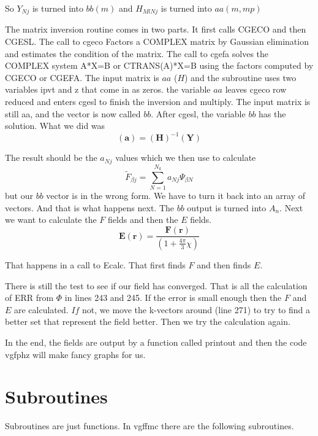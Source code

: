 \documentclass{article}
\begin{document}
So $Y_{Nj}$ is turned into $bb\left( m\right) $ and $H_{MlNj}$ is turned
into $aa(m,mp)$

The matrix inversion routine comes in two parts. It first calls CGECO and
then CGESL. The call to cgeco Factors a COMPLEX matrix by Gaussian
elimination and estimates the condition of the matrix. The call to cgefa
solves the COMPLEX system A*X=B or CTRANS(A)*X=B using the factors computed
by CGECO or CGEFA. The input matrix is $aa$ ($H$) and the subroutine uses
two variables ipvt and z that come in as zeros. the variable $aa$ leaves
cgeco row reduced and enters cgesl to finish the inversion and multiply. The
input matrix is still aa, and the vector is now called $bb.$ After cgesl,
the variable $bb$ has the solution. What we did was 
\begin{equation}
\left( \mathbf{a}\right) =\left( \mathbf{H}\right) ^{-1}\left( \mathbf{Y}%
\right) 
\end{equation}

The result should be the $a_{Nj}$ values which we then use to calculate 
\begin{equation}
\tilde{F}_{\beta j}\mathbf{=}\sum_{N=1}^{N_{k}}a_{Nj}\Psi _{\beta N}
\end{equation}%
but our $bb$ vector is in the wrong form. We have to turn it back into an
array of vectors. And that is what happens next. The $bb$ output is turned
into $A_{n}.$ Next we want to calculate the $F$ fields and then the $E$
fields.  
\[
\mathbf{E}(\mathbf{r})=\frac{\mathbf{F}(\mathbf{r})}{(1+\frac{4\pi }{3}\chi )%
}
\]

That happens in a call to Ecalc. That first finds $F$ and then finds $E.$

There is still the test to see if our field has converged. That is all the
calculation of ERR from $\Phi $ in lines 243 and 245. If the error is small
enough then the $F$ and $E$ are calculated. $If$ not, we move the k-vectors
around (line 271) to try to find a better set that represent the field
better. Then we try the calculation again. 

In the end, the fields are output by a function called printout and then the
code vgfphz will make fancy graphs for us.

\section{Subroutines}

Subroutines are just functions. In vgffmc there are the following
subroutines.
\end{document}
